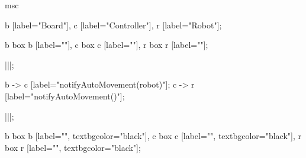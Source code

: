 
\begin{msc}
msc
{

b [label="Board"],
c [label="Controller"],
r [label="Robot"];

b box b [label=""],
c box c [label=""],
r box r [label=""];

|||;

b -> c [label="notifyAutoMovement(robot)"];
c -> r [label="notifyAutoMovement()"];

|||;

b box b [label="", textbgcolor="black"],
c box c [label="", textbgcolor="black"],
r box r [label="", textbgcolor="black"];

}
\end{msc}
